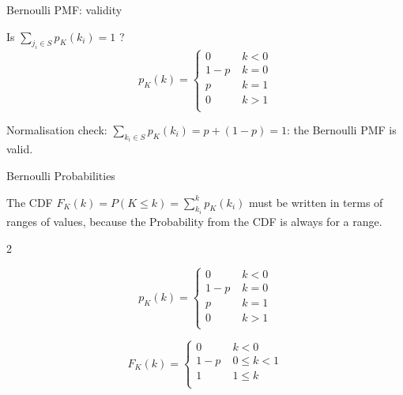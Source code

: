 \documentclass[10pt,sans,english,compress,xcolor=dvipsnames]{beamer}
\begin{document}
\begin{frame}{Bernoulli PMF: validity}

\small

Is $\sum\limits_{j_i \in S} p_K(k_i) =1$ ?\\[1ex]
\begin{equation}\nonumber
p_K(k) = 
\begin{cases}
     0\; & k<0\\[1ex] 
     1-p\; & k=0\\[1ex] 
  p\; & k=1 \\[2ex]
  0\; & k>1\\[2ex]
\end{cases}
\end{equation}

\vspace{0.5cm}

Normalisation check: $ \sum\limits_{k_i \in S} p_K(k_i) = p + (1-p) = 1$: the Bernoulli PMF is valid.

\end{frame} 


\begin{frame}{Bernoulli Probabilities}

The CDF $F_K(k) = P(K\leq k) = \sum\limits_{k_i}^{k} p_K(k_i) $ must be written in terms of ranges of values, because the Probability from the CDF is always for a range.\\

\begin{multicols}{2}
\small

\begin{equation}\nonumber
p_K(k) = 
\begin{cases}
     0\; & k<0\\[1ex] 
     1-p\; & k=0\\[1ex] 
  p\; & k=1 \\[2ex]
  0\; & k>1\\[2ex]
\end{cases}
\end{equation}

\begin{equation}\nonumber
F_K(k) = 
\begin{cases}
     0\; & k<0\\[1ex] 
  1-p\; & 0\leq k<1 \\[2ex]
  1\; & 1 \leq k \\[2ex]
\end{cases}
\end{equation}


\end{multicols}
\end{frame} 
\end{document}
